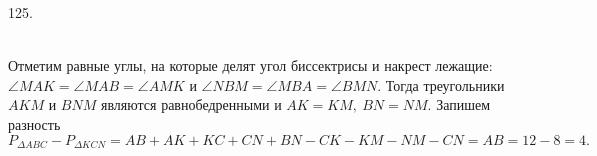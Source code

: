 125. \begin{figure}[ht!]
\end{figure}\\
Отметим равные углы, на которые делят угол биссектрисы и накрест лежащие: $\angle MAK=\angle MAB=\angle AMK$ и $\angle NBM=\angle MBA=\angle BMN.$ Тогда треугольники $AKM$ и $BNM$ являются равнобедренными и $AK=KM,\ BN=NM.$ Запишем разность $P_{\Delta ABC}-P_{\Delta KCN}=AB+AK+KC+CN+BN-CK-KM-NM-CN=AB=12-8=4.$\\
